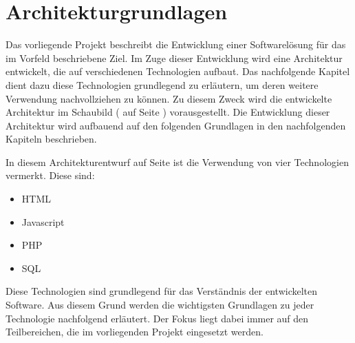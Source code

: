 \section{Architekturgrundlagen}
\label{sec:Architekturgrundlagen}

Das vorliegende Projekt beschreibt die Entwicklung einer Softwarelösung für das im Vorfeld beschriebene Ziel.
Im Zuge dieser Entwicklung wird eine Architektur entwickelt, die auf verschiedenen Technologien aufbaut.
Das nachfolgende Kapitel dient dazu diese Technologien grundlegend zu erläutern, um deren weitere Verwendung
nachvollziehen zu können. Zu diesem Zweck wird die entwickelte Architektur im Schaubild ( auf Seite \pageref{fig:Architektur}) vorausgestellt.
Die Entwicklung dieser Architektur wird aufbauend auf den folgenden Grundlagen in den nachfolgenden Kapiteln beschrieben.

In diesem Architekturentwurf auf Seite \pageref{fig:Architektur} ist die Verwendung von vier Technologien vermerkt. Diese sind:
\begin{itemize}
  \item HTML
  \item Javascript
  \item PHP
  \item SQL
\end{itemize}

Diese Technologien sind grundlegend für das Verständnis der entwickelten Software.
Aus diesem Grund werden die wichtigsten Grundlagen zu jeder Technologie nachfolgend erläutert.
Der Fokus liegt dabei immer auf den Teilbereichen, die im vorliegenden Projekt eingesetzt werden.